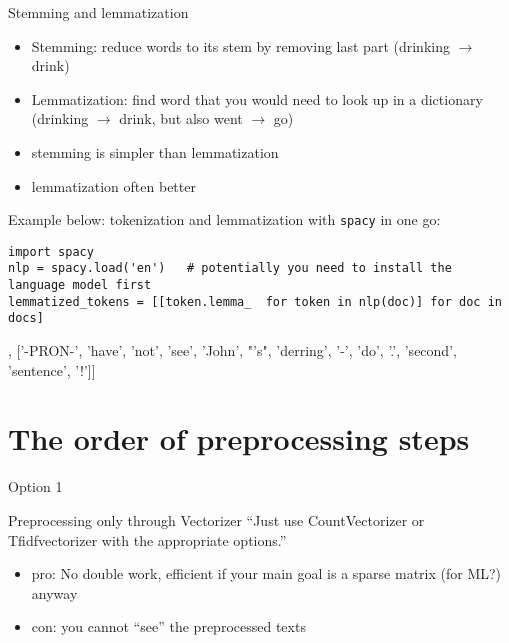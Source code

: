 \documentclass[compress]{beamer}
\begin{document}
\begin{frame}[fragile]{Stemming and lemmatization}
\begin{itemize}
\item Stemming: reduce words to its stem by removing last part (drinking $\rightarrow$ drink)
\item Lemmatization: find word that you would need to look up in a dictionary (drinking $\rightarrow$ drink, but also went $\rightarrow$ go)
\item stemming is simpler than lemmatization
\item lemmatization often better
\end{itemize}
\pause

Example below: tokenization and lemmatization with \texttt{spacy} in one go:
\begin{lstlisting}
import spacy
nlp = spacy.load('en')   # potentially you need to install the language model first
lemmatized_tokens = [[token.lemma_  for token in nlp(doc)] for doc in docs]
\end{lstlisting}
\begin{lstlistingoutputtiny}
[['this', 'be', 'a', 'text'], ['-PRON-', 'have', 'not', 'see', 'John', "'s", 'derring', '-', 'do', '.', 'second', 'sentence', '!']]
\end{lstlistingoutputtiny}
\end{frame}



\section{The order of preprocessing steps}

\begin{frame}{Option 1}
\begin{block}{Preprocessing only through Vectorizer}
``Just use CountVectorizer or Tfidfvectorizer with the appropriate options.''	
\begin{itemize}
	\item pro: No double work, efficient if your main goal is a sparse matrix (for ML?) anyway
	\item con: you cannot ``see'' the preprocessed texts
\end{itemize}
\end{block}
\end{frame}
\end{document}
